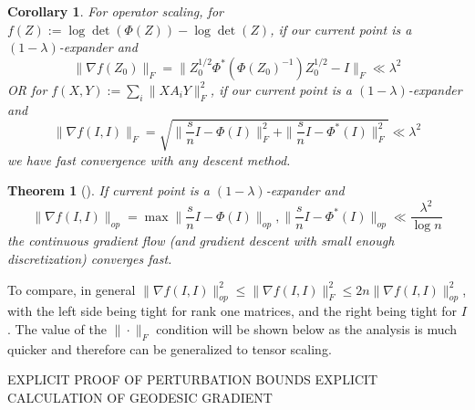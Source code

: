 \documentclass{article}
\newtheorem{theorem}{Theorem}
\newtheorem{corollary}{Corollary}
\begin{document}
\begin{corollary}
For operator scaling, for $f(Z) := \log\det(\Phi(Z)) - \log\det(Z)$, if our current point is a $(1 - \lambda)$-expander and 
\[ \|\nabla f(Z_{0})\|_{F} = \|Z_{0}^{1/2} \Phi^{*}( \Phi(Z_{0})^{-1} ) Z_{0}^{1/2} - I\|_{F} \ll \lambda^{2}   \]
\emph{OR} for $f(X,Y) := \sum_{i} \|X A_{i} Y\|_{F}^{2}$, if our current point is a $(1 - \lambda)$-expander and 
\[ \|\nabla f(I,I)\|_{F} = \sqrt{\|\frac{s}{n} I - \Phi(I)\|_{F}^{2} + \|\frac{s}{n} I - \Phi^{*}(I) \|_{F}^{2}} \ll \lambda^{2}     \]
we have fast convergence with any descent method. 
\end{corollary}

\begin{theorem}[\cite{KLR19}]
If current point is a $(1 - \lambda)$-expander and 
\[  \|\nabla f(I,I)\|_{op} = \max{ \|\frac{s}{n} I - \Phi(I)\|_{op}, \|\frac{s}{n} I - \Phi^{*}(I) \|_{op} } \ll \frac{\lambda^{2}}{\log n}  \]
the continuous gradient flow (and gradient descent with small enough discretization) converges fast. 
\end{theorem}

To compare, in general $\|\nabla f(I,I)\|_{op}^{2} \leq \|\nabla f(I,I)\|_{F}^{2} \leq 2n \|\nabla f(I,I)\|_{op}^{2}$, with the left side being tight for rank one matrices, and the right being tight for $I$. The value of the $\|\cdot\|_{F}$ condition will be shown below as the analysis is much quicker and therefore can be generalized to tensor scaling. 


EXPLICIT PROOF OF PERTURBATION BOUNDS
EXPLICIT CALCULATION OF GEODESIC GRADIENT
\end{document}
